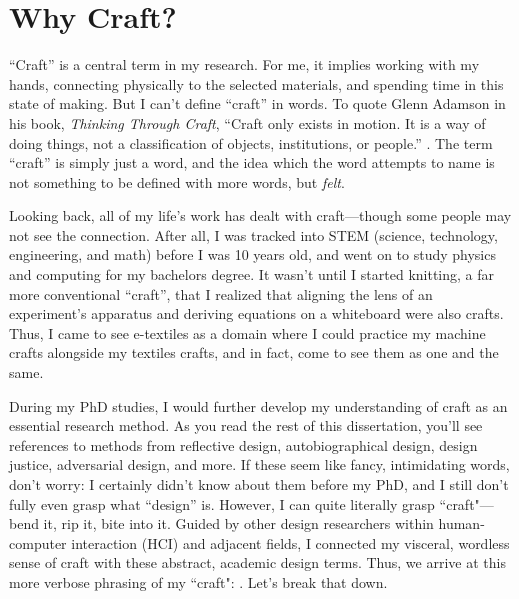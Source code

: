\begin{quote}
\end{quote}

\section{Why Craft?}

``Craft'' is a central term in my research. For me, it implies working with my hands, connecting physically to the selected materials, and spending time in this state of making. But I can't define ``craft'' in words. To quote Glenn Adamson in his book, \textit{Thinking Through Craft}, ``Craft only exists in motion. It is a way of doing things, not a classification of objects, institutions, or people.'' \cite{adamson_thinking_2019}. The term ``craft'' is simply just a word, and the idea which the word attempts to name is not something to be defined with more words, but \textit{felt}. 

Looking back, all of my life's work has dealt with craft---though some people may not see the connection. After all, I was tracked into STEM (science, technology, engineering, and math) before I was 10 years old, and went on to study physics and computing for my bachelors degree. It wasn't until I started knitting, a far more conventional ``craft'', that I realized that aligning the lens of an experiment's apparatus and deriving equations on a whiteboard were also crafts. Thus, I came to see e-textiles as a domain where I could practice my machine crafts alongside my textiles crafts, and in fact, come to see them as one and the same.

During my PhD studies, I would further develop my understanding of craft as an essential research method. As you read the rest of this dissertation, you'll see references to methods from reflective design, autobiographical design, design justice, adversarial design, and more. If these seem like fancy, intimidating words, don't worry: I certainly didn't know about them before my PhD, and I still don't fully even grasp what ``design'' is. However, I can quite literally grasp ``craft"---bend it, rip it, bite into it. Guided by other design researchers within human-computer interaction (HCI) and adjacent fields, I connected my visceral, wordless sense of craft with these abstract, academic design terms. Thus, we arrive at this more verbose phrasing of my ``craft": . Let's break that down.

